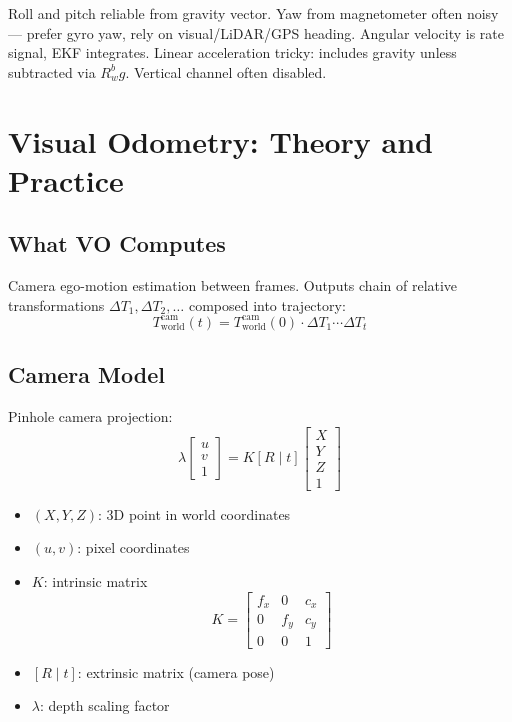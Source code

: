 \documentclass[11pt,a4paper]{article}
\begin{document}
Roll and pitch reliable from gravity vector. Yaw from magnetometer often noisy --- prefer gyro yaw, rely on visual/LiDAR/GPS heading. Angular velocity is rate signal, EKF integrates. Linear acceleration tricky: includes gravity unless subtracted via $R^b_w g$. Vertical channel often disabled.

\section{Visual Odometry: Theory and Practice}

\subsection{What VO Computes}

Camera ego-motion estimation between frames. Outputs chain of relative transformations $\Delta T_1, \Delta T_2, \ldots$ composed into trajectory:
\[
T_{\text{world}}^{\text{cam}}(t) = T_{\text{world}}^{\text{cam}}(0) \cdot \Delta T_1 \cdots \Delta T_t
\]

\subsection{Camera Model}

Pinhole camera projection:
\[
\lambda \begin{bmatrix}u \\ v \\ 1\end{bmatrix} = K [R\;|\;t] \begin{bmatrix}X \\ Y \\ Z \\ 1\end{bmatrix}
\]
\begin{itemize}
\item $(X, Y, Z)$: 3D point in world coordinates
\item $(u, v)$: pixel coordinates
\item $K$: intrinsic matrix
\[
K = \begin{bmatrix}f_x & 0 & c_x \\ 0 & f_y & c_y \\ 0 & 0 & 1\end{bmatrix}
\]
\item $[R\;|\;t]$: extrinsic matrix (camera pose)
\item $\lambda$: depth scaling factor
\end{itemize}
\end{document}
